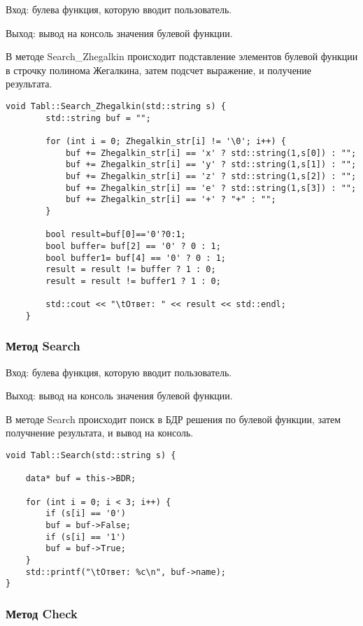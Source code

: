\documentclass[10pt,a4paper,final]{article} %
\begin{document}
\par Вход: булева функция, которую вводит пользователь.
\par Выход: вывод на консоль значения булевой функции.
\par В методе  Search\_Zhegalkin происходит подставление элементов булевой функции в строчку полинома Жегалкина, затем подсчет выражение, и получение результата.
\begin{lstlisting}[caption={Метод Search\_Zhegalkin}]
	void Tabl::Search_Zhegalkin(std::string s) {
		std::string buf = "";
	
		for (int i = 0; Zhegalkin_str[i] != '\0'; i++) {
			buf += Zhegalkin_str[i] == 'x' ? std::string(1,s[0]) : "";
			buf += Zhegalkin_str[i] == 'y' ? std::string(1,s[1]) : "";
			buf += Zhegalkin_str[i] == 'z' ? std::string(1,s[2]) : "";
			buf += Zhegalkin_str[i] == 'e' ? std::string(1,s[3]) : "";
			buf += Zhegalkin_str[i] == '+' ? "+" : "";
		}
		
		bool result=buf[0]=='0'?0:1;
		bool buffer= buf[2] == '0' ? 0 : 1;
		bool buffer1= buf[4] == '0' ? 0 : 1;
		result = result != buffer ? 1 : 0;
		result = result != buffer1 ? 1 : 0;
	
		std::cout << "\tОтвет: " << result << std::endl;
	}
\end{lstlisting}


\subsubsection{Метод Search}

\par Вход: булева функция, которую вводит пользователь.
\par Выход: вывод на консоль значения булевой функции.
\par В методе  Search происходит поиск в БДР решения по булевой функции, затем получнение результата, и вывод на консоль.
\begin{lstlisting}[caption={Метод Search}]
void Tabl::Search(std::string s) {
	
	data* buf = this->BDR;
	
	for (int i = 0; i < 3; i++) {
		if (s[i] == '0')
		buf = buf->False;
		if (s[i] == '1')
		buf = buf->True;
	}
	std::printf("\tОтвет: %c\n", buf->name);
}
\end{lstlisting}


\subsubsection{Метод Check}
\end{document}
